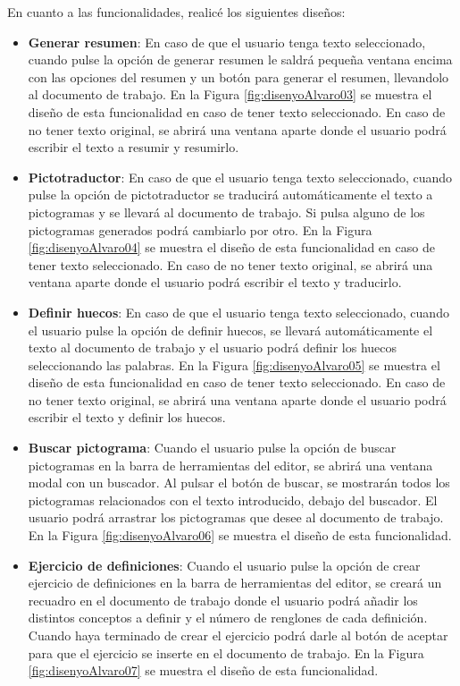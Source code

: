 En cuanto a las funcionalidades, realicé los siguientes diseños:
\begin{itemize}
  \item \textbf{Generar resumen}: En caso de que el usuario tenga texto seleccionado, cuando pulse la opción de generar resumen le saldrá pequeña ventana encima con las opciones del resumen y un botón para generar el resumen, llevandolo al documento de trabajo. En la Figura \ref{fig:disenyoAlvaro03} se muestra el diseño de esta funcionalidad en caso de tener texto seleccionado. En caso de no tener texto original, se abrirá una ventana aparte donde el usuario podrá escribir el texto a resumir y resumirlo.
  \item \textbf{Pictotraductor}: En caso de que el usuario tenga texto seleccionado, cuando pulse la opción de pictotraductor se traducirá automáticamente el texto a pictogramas y se llevará al documento de trabajo. Si pulsa alguno de los pictogramas generados podrá cambiarlo por otro. En la Figura \ref{fig:disenyoAlvaro04} se muestra el diseño de esta funcionalidad en caso de tener texto seleccionado. En caso de no tener texto original, se abrirá una ventana aparte donde el usuario podrá escribir el texto y traducirlo.
  \item \textbf{Definir huecos}: En caso de que el usuario tenga texto seleccionado, cuando el usuario pulse la opción de definir huecos, se llevará automáticamente el texto al documento de trabajo y el usuario podrá definir los huecos seleccionando las palabras. En la Figura \ref{fig:disenyoAlvaro05} se muestra el diseño de esta funcionalidad en caso de tener texto seleccionado. En caso de no tener texto original, se abrirá una ventana aparte donde el usuario podrá escribir el texto y definir los huecos.
  \item \textbf{Buscar pictograma}: Cuando el usuario pulse la opción de buscar pictogramas en la barra de herramientas del editor, se abrirá una ventana modal con un buscador. Al pulsar el botón de buscar, se mostrarán todos los pictogramas relacionados con el texto introducido, debajo del buscador.
        El usuario podrá arrastrar los pictogramas que desee al documento de trabajo. En la Figura \ref{fig:disenyoAlvaro06} se muestra el diseño de esta funcionalidad.
  \item \textbf{Ejercicio de definiciones}: Cuando el usuario pulse la opción de crear ejercicio de definiciones en la barra de herramientas del editor, se creará un recuadro en el documento de trabajo donde el usuario podrá añadir los distintos conceptos a definir y el número de renglones de cada definición. Cuando haya terminado de crear el ejercicio podrá darle al botón de aceptar para que el ejercicio se inserte en el documento de trabajo. En la Figura \ref{fig:disenyoAlvaro07} se muestra el diseño de esta funcionalidad.

\end{itemize}
